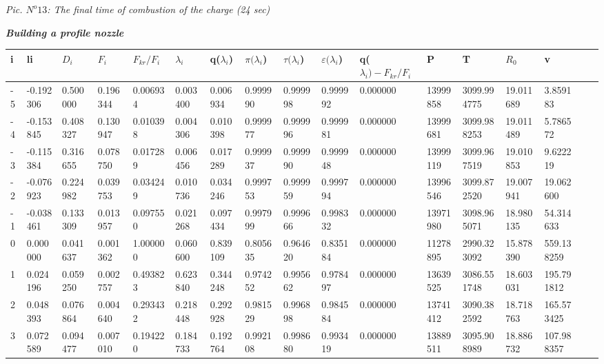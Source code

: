 \begin{flushright}
\textit{ Pic. $N^o 13$: The final time of combustion of the charge (24 sec) } \\
\end{flushright}
\newpage
\begin{center}
\begin{large}
\textbf{\textit {Building a profile nozzle}}\\
\end{large}
\begin{tabular}{|l*{16}{l|}}
\hline
i & li & \(D_i\) & \(F_i\) & \(F_{kr}/F_i\) & $\lambda_i$ & q($\lambda_i$) & $\pi(\lambda_i$) & $\tau(\lambda_i$) & $\varepsilon(\lambda_i$) & q($\lambda_i) - F_{kr}/F_i$ & P & T & \(R_0\) & v  \\
\hline
-5 & -0.192306 & 0.500000 & 0.196344 & 0.006934 & 0.003400 & 0.006934 & 0.999990 & 0.999998 & 0.999992 & 0.000000 & 13999858 & 3099.994775 & 19.011689 & 3.859183 \\
-4 & -0.153845 & 0.408327 & 0.130947 & 0.010398 & 0.004306 & 0.010398 & 0.999977 & 0.999996 & 0.999981 & 0.000000 & 13999681 & 3099.988253 & 19.011489 & 5.786572 \\
-3 & -0.115384 & 0.316655 & 0.078750 & 0.017289 & 0.006456 & 0.017289 & 0.999937 & 0.999990 & 0.999948 & 0.000000 & 13999119 & 3099.967519 & 19.010853 & 9.622219 \\
-2 & -0.076923 & 0.224982 & 0.039753 & 0.034249 & 0.010736 & 0.034246 & 0.999753 & 0.999959 & 0.999794 & 0.000000 & 13996546 & 3099.872520 & 19.007941 & 19.062600 \\
-1 & -0.038461 & 0.133309 & 0.013957 & 0.097550 & 0.021268 & 0.097434 & 0.997999 & 0.999666 & 0.998332 & 0.000000 & 13971980 & 3098.965071 & 18.980135 & 54.314633 \\
0 & 0.000000 & 0.041637 & 0.001362 & 1.000000 & 0.060600 & 0.839109 & 0.805635 & 0.964620 & 0.835184 & 0.000000 & 11278895 & 2990.323092 & 15.878390 & 559.138259 \\
1 & 0.024196 & 0.059250 & 0.002757 & 0.493823 & 0.623840 & 0.344248 & 0.974252 & 0.995662 & 0.978497 & 0.000000 & 13639525 & 3086.551748 & 18.603031 & 195.791812 \\
2 & 0.048393 & 0.076864 & 0.004640 & 0.293432 & 0.218448 & 0.292928 & 0.981529 & 0.996898 & 0.984584 & 0.000000 & 13741412 & 3090.382592 & 18.718763 & 165.573425 \\
3 & 0.072589 & 0.094477 & 0.007010 & 0.194220 & 0.184733 & 0.192764 & 0.992108 & 0.998680 & 0.993419 & 0.000000 & 13889511 & 3095.908989 & 18.886732 & 107.988357 \\

\end{tabular}
\end{center}
